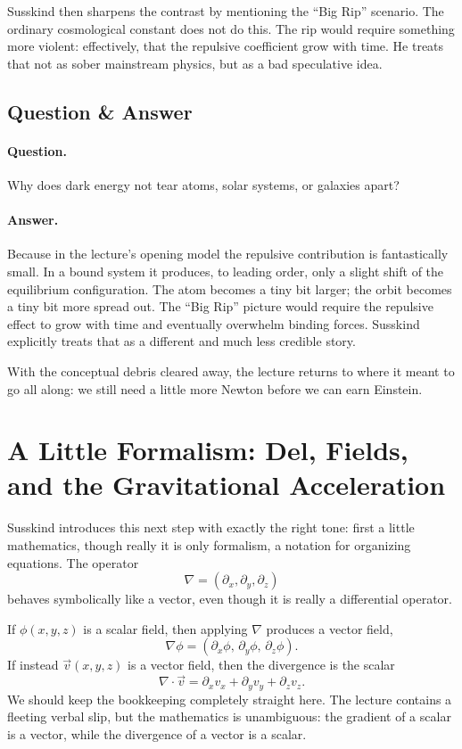 Susskind then sharpens the contrast by mentioning the ``Big Rip'' scenario. The ordinary cosmological constant does not do this. The rip would require something more violent: effectively, that the repulsive coefficient grow with time. He treats that not as sober mainstream physics, but as a bad speculative idea.

\subsection{Question \& Answer}

\paragraph{Question.} Why does dark energy not tear atoms, solar systems, or galaxies apart?

\paragraph{Answer.} Because in the lecture's opening model the repulsive contribution is fantastically small. In a bound system it produces, to leading order, only a slight shift of the equilibrium configuration. The atom becomes a tiny bit larger; the orbit becomes a tiny bit more spread out. The ``Big Rip'' picture would require the repulsive effect to grow with time and eventually overwhelm binding forces. Susskind explicitly treats that as a different and much less credible story.

With the conceptual debris cleared away, the lecture returns to where it meant to go all along: we still need a little more Newton before we can earn Einstein.

\section{A Little Formalism: Del, Fields, and the Gravitational Acceleration}

Susskind introduces this next step with exactly the right tone: first a little mathematics, though really it is only formalism, a notation for organizing equations. The operator
\begin{equation}
\nabla = (\partial_x,\partial_y,\partial_z)
\end{equation}
behaves symbolically like a vector, even though it is really a differential operator.

If $\phi(x,y,z)$ is a scalar field, then applying $\nabla$ produces a vector field,
\begin{equation}
\nabla \phi
=
\left(
\partial_x\phi,\,
\partial_y\phi,\,
\partial_z\phi
\right).
\end{equation}
If instead $\vec v(x,y,z)$ is a vector field, then the divergence is the scalar
\begin{equation}
\nabla\cdot\vec v
=
\partial_x v_x+\partial_y v_y+\partial_z v_z.
\end{equation}
We should keep the bookkeeping completely straight here. The lecture contains a fleeting verbal slip, but the mathematics is unambiguous: the gradient of a scalar is a vector, while the divergence of a vector is a scalar.

